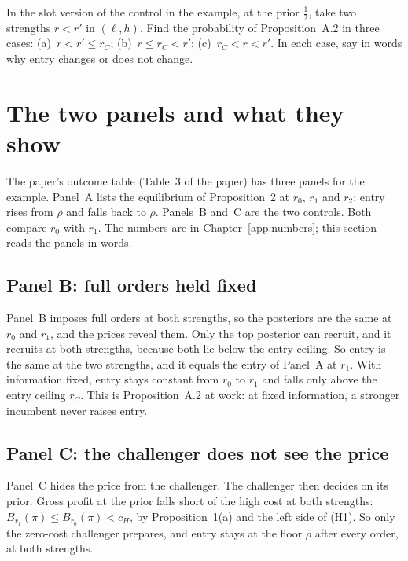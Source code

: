 \begin{checkyourself}
\label{q:example-control}
In the slot version of the control in the example, at the prior \(\tfrac12\), take two strengths \(r<r'\) in
\((\ell,h)\). Find the probability of Proposition~A.2 in three cases: (a)~\(r<r'\le r_C\); (b)~\(r\le r_C<r'\);
(c)~\(r_C<r<r'\). In each case, say in words why entry changes or does not change.
\end{checkyourself}

\section{The two panels and what they show}\label{sec:example-panels}

The paper's outcome table (Table~3 of the paper) has three panels for the example. Panel~A lists the equilibrium of
Proposition~2 at \(r_0\), \(r_1\) and \(r_2\): entry rises from \(\rho\) and falls back to \(\rho\). Panels~B and~C are
the two controls. Both compare \(r_0\) with \(r_1\). The numbers are in Chapter~\ref{app:numbers}; this section reads
the panels in words.

\subsection{Panel B: full orders held fixed}

Panel~B imposes full orders at both strengths, so the posteriors are the same at \(r_0\) and \(r_1\), and the
prices reveal them. Only the top posterior can recruit, and it recruits at both strengths, because both lie below
the entry ceiling. So entry is the same at the two strengths, and it equals the entry of Panel~A at \(r_1\). With information fixed,
entry stays constant from \(r_0\) to \(r_1\) and falls only above the entry ceiling \(r_C\). This is
Proposition~A.2 at work: at fixed information, a stronger incumbent never raises entry.

\subsection{Panel C: the challenger does not see the price}

Panel~C hides the price from the challenger. The challenger then decides on its prior. Gross profit at the prior
falls short of the high cost at both strengths: \(B_{r_1}(\pi)\le B_{r_0}(\pi)<c_H\), by Proposition~1(a) and the left
side of (H1). So only the zero-cost challenger prepares, and entry stays at the floor \(\rho\) after every order, at
both strengths.


